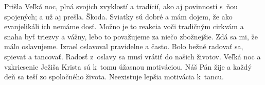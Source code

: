 







Prišla Veľká noc, plná svojich zvyklostí a tradícií, ako aj povinností s~ňou spojených; a už aj prešla. Škoda. Sviatky sú dobré a mám dojem, že ako evanjelikáli ich nemáme dosť. Možno je to reakcia voči tradičným cirkvám a snaha byť triezvy a vážny, lebo to považujeme za niečo zbožnejšie. Zdá sa mi, že málo oslavujeme. Izrael oslavoval pravidelne a často. Bolo bežné radovať sa, spievať a tancovať. Radosť z~oslavy sa musí vrátiť do našich životov. Veľká noc a vzkriesenie Ježiša Krista sú k~tomu úžasnou motiváciou. Náš Pán žije a každý deň sa teší zo spoločného života. Neexistuje lepšia motivácia k~tancu.

